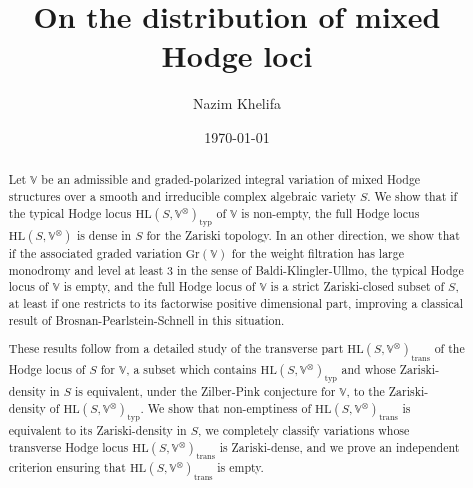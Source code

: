 \documentclass[10pt]{article}
\title{On the distribution of mixed Hodge loci}
\author{Nazim Khelifa}
\date{\today}
\numberwithin{equation}{subsection}
\theoremstyle{plain}
\theoremstyle{definition}
\theoremstyle{remark}
\newcommand{\V}{\mathbb V}
\newcommand{\HL}{\mathrm{HL}(S, \V^\otimes)}
\newcommand{\gr}{\mathrm{Gr}}
\newcommand{\typ}{\mathrm{typ}}
\newcommand{\trans}{\mathrm{trans}}
\begin{document}
%
%
\maketitle
\begin{abstract}
Let $\V$ be an admissible and graded-polarized integral variation of mixed Hodge structures over a smooth and irreducible complex algebraic variety $S$. We show that if the typical Hodge locus $\HL_\typ$ of $\V$ is non-empty, the full Hodge locus $\HL$ is dense in $S$ for the Zariski topology. In an other direction, we show that if the associated graded variation $\gr(\V)$ for the weight filtration has large monodromy and level at least $3$ in the sense of Baldi-Klingler-Ullmo, the typical Hodge locus of $\V$ is empty, and the full Hodge locus of $\V$ is a strict Zariski-closed subset of $S$, at least if one restricts to its factorwise positive dimensional part, improving a classical result of Brosnan-Pearlstein-Schnell in this situation.

These results follow from a detailed study of the transverse part $\HL_\trans$ of the Hodge locus of $S$ for $\V$, a subset which contains $\HL_\typ$ and whose Zariski-density in $S$ is equivalent, under the Zilber-Pink conjecture for $\V$, to the Zariski-density of $\HL_\typ$. We show that non-emptiness of $\HL_\trans$ is equivalent to its Zariski-density in $S$, we completely classify variations whose transverse Hodge locus $\HL_\trans$ is Zariski-dense, and we prove an independent criterion ensuring that $\HL_\trans$ is empty.
\end{abstract}
\begin{center}
\tableofcontents
\end{center}
\end{document}
